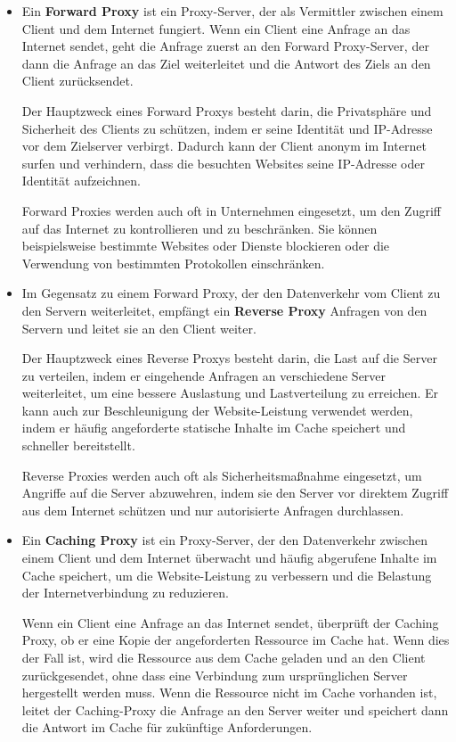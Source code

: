 \documentclass[../vs-script-first-v01.tex]{subfiles}
\begin{document}
\begin{itemize}
\item Ein \textbf{Forward Proxy} ist ein Proxy-Server, der als Vermittler zwischen einem Client und dem Internet fungiert. Wenn ein Client eine Anfrage an das Internet sendet, geht die Anfrage zuerst an den Forward Proxy-Server, der dann die Anfrage an das Ziel weiterleitet und die Antwort des Ziels an den Client zurücksendet.

Der Hauptzweck eines Forward Proxys besteht darin, die Privatsphäre und Sicherheit des Clients zu schützen, indem er seine Identität und IP-Adresse vor dem Zielserver verbirgt. Dadurch kann der Client anonym im Internet surfen und verhindern, dass die besuchten Websites seine IP-Adresse oder Identität aufzeichnen.

Forward Proxies werden auch oft in Unternehmen eingesetzt, um den Zugriff auf das Internet zu kontrollieren und zu beschränken. Sie können beispielsweise bestimmte Websites oder Dienste blockieren oder die Verwendung von bestimmten Protokollen einschränken.
\item Im Gegensatz zu einem Forward Proxy, der den Datenverkehr vom Client zu den Servern weiterleitet, empfängt ein \textbf{Reverse Proxy} Anfragen von den Servern und leitet sie an den Client weiter.

Der Hauptzweck eines Reverse Proxys besteht darin, die Last auf die Server zu verteilen, indem er eingehende Anfragen an verschiedene Server weiterleitet, um eine bessere Auslastung und Lastverteilung zu erreichen. Er kann auch zur Beschleunigung der Website-Leistung verwendet werden, indem er häufig angeforderte statische Inhalte im Cache speichert und schneller bereitstellt.

Reverse Proxies werden auch oft als Sicherheitsmaßnahme eingesetzt, um Angriffe auf die Server abzuwehren, indem sie den Server vor direktem Zugriff aus dem Internet schützen und nur autorisierte Anfragen durchlassen.

\item Ein \textbf{Caching Proxy} ist ein Proxy-Server, der den Datenverkehr zwischen einem Client und dem Internet überwacht und häufig abgerufene Inhalte im Cache speichert, um die Website-Leistung zu verbessern und die Belastung der Internetverbindung zu reduzieren.

Wenn ein Client eine Anfrage an das Internet sendet, überprüft der Caching Proxy, ob er eine Kopie der angeforderten Ressource im Cache hat. Wenn dies der Fall ist, wird die Ressource aus dem Cache geladen und an den Client zurückgesendet, ohne dass eine Verbindung zum ursprünglichen Server hergestellt werden muss. Wenn die Ressource nicht im Cache vorhanden ist, leitet der Caching-Proxy die Anfrage an den Server weiter und speichert dann die Antwort im Cache für zukünftige Anforderungen.


\end{itemize}
\end{document}
